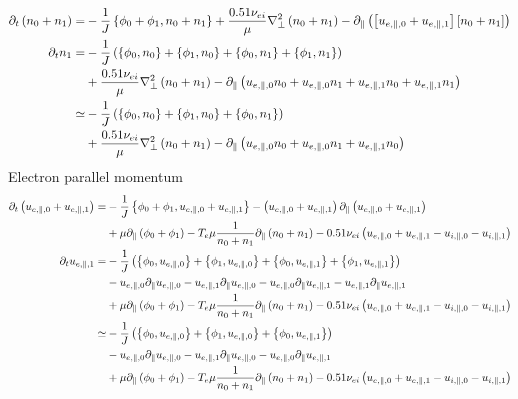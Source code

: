\begin{align*}
 \partial_t \left( n_0+n_1 \right)
 =&
 -\frac{1}{J}\left\{\phi_0 + \phi_1,n_0+n_1\right\}
 +\frac{0.51\nu_{ei}}{\mu} \nabla_\perp^2 \left( n_0+n_1 \right)
-  \partial_\| \left( \left[ u_{e,\|,0} +u_{e,\|,1} \right]
\left[ n_0+ n_1 \right]
\right)
\\
\partial_t n_1
 =&
 -\frac{1}{J}\left(
   \left\{\phi_0,n_0\right\}
 + \left\{\phi_1,n_0\right\}
 + \left\{\phi_0,n_1\right\}
 + \left\{\phi_1,n_1\right\}
 \right)
 \\&
 +\frac{0.51\nu_{ei}}{\mu} \nabla_\perp^2 \left( n_0+n_1 \right)
-  \partial_\| \left(
 u_{e,\|,0} n_0+u_{e,\|,0} n_1  + u_{e,\|,1} n_0+ u_{e,\|,1}n_1
\right)
\\
\simeq&
 -\frac{1}{J}\left(
   \left\{\phi_0,n_0\right\}
 + \left\{\phi_1,n_0\right\}
 + \left\{\phi_0,n_1\right\}
 \right)
 \\&
 +\frac{0.51\nu_{ei}}{\mu} \nabla_\perp^2 \left( n_0+n_1 \right)
-  \partial_\| \left(
u_{e,\|,0} n_0+u_{e,\|,0} n_1  + u_{e,\|,1} n_0
\right)
\end{align*}
Electron parallel momentum
\begin{align*}
\partial_t
\left( u_{e,\|,0} + u_{e,\|,1} \right)
 =&
 -\frac{1}{J}\left\{ \phi_0 + \phi_1 , u_{e,\|,0} + u_{e,\|,1} \right\}
 -
\left( u_{e,\|,0} + u_{e,\|,1} \right)
 \partial_\|
\left( u_{e,\|,0} + u_{e,\|,1} \right)
\\&
+ \mu \partial_\| \left( \phi_0 + \phi_1 \right)
-
T_e \mu \frac{1}{ n_0 + n_1 }\partial_\| \left( n_0 + n_1 \right)
 - 0.51 \nu_{ei} \left(
 u_{e,\|,0} + u_{e,\|,1}
 -
 u_{i,\|,0} - u_{i,\|,1}
 \right)
 \\
 \partial_t u_{e,\|,1}
 =&
 -\frac{1}{J}\left(
   \left\{\phi_0,u_{e,\|,0}\right\}
 + \left\{\phi_1,u_{e,\|,0}\right\}
 + \left\{\phi_0,u_{e,\|,1}\right\}
 + \left\{\phi_1,u_{e,\|,1}\right\}
 \right)
\\&
 - u_{e,\|,0} \partial_\| u_{e,\|,0}
 - u_{e,\|,1} \partial_\| u_{e,\|,0}
 - u_{e,\|,0} \partial_\| u_{e,\|,1}
 - u_{e,\|,1} \partial_\| u_{e,\|,1}
\\&
+ \mu \partial_\| \left( \phi_0 + \phi_1 \right)
-
T_e \mu \frac{1}{ n_0 + n_1 }\partial_\| \left( n_0 + n_1 \right)
 - 0.51 \nu_{ei} \left(
 u_{e,\|,0} + u_{e,\|,1}
 -
 u_{i,\|,0} - u_{i,\|,1}
 \right)
 \\
 \simeq&
 -\frac{1}{J}\left(
   \left\{\phi_0,u_{e,\|,0}\right\}
 + \left\{\phi_1,u_{e,\|,0}\right\}
 + \left\{\phi_0,u_{e,\|,1}\right\}
 \right)
\\&
 - u_{e,\|,0} \partial_\| u_{e,\|,0}
 - u_{e,\|,1} \partial_\| u_{e,\|,0}
 - u_{e,\|,0} \partial_\| u_{e,\|,1}
\\&
+ \mu \partial_\| \left( \phi_0 + \phi_1 \right)
-
T_e \mu \frac{1}{ n_0 + n_1 }\partial_\| \left( n_0 + n_1 \right)
 - 0.51 \nu_{ei} \left(
 u_{e,\|,0} + u_{e,\|,1}
 -
 u_{i,\|,0} - u_{i,\|,1}
 \right)
\end{align*}
